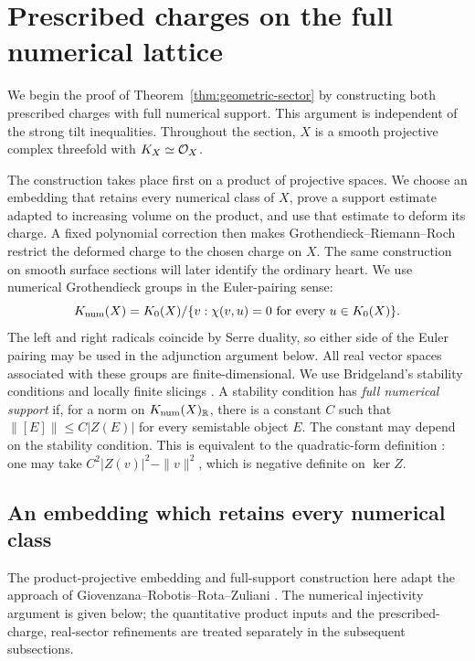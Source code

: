 \section{Prescribed charges on the full numerical lattice}
\label{sec:ambient}

We begin the proof of Theorem~\ref{thm:geometric-sector} by constructing
both prescribed charges with full numerical support.  This argument is
independent of the strong tilt inequalities.  Throughout the section,
$X$ is a smooth projective complex threefold with $K_X\simeq\mathcal O_X$.

The construction takes place first on a product of projective spaces.
We choose an embedding that retains every numerical class of $X$, prove
a support estimate adapted to increasing volume on the product, and use
that estimate to deform its charge.  A fixed polynomial correction then
makes Grothendieck--Riemann--Roch restrict the deformed charge to the
chosen charge on $X$.  The same construction on smooth surface sections
will later identify the ordinary heart.
We use numerical Grothendieck groups in the Euler-pairing sense:
\[
 K_{\mathrm{num}}(X)=K_0(X)/\{v:\chi(v,u)=0\text{ for every }u\in K_0(X)\}.
\]
The left and right radicals coincide by Serre duality, so either side of
the Euler pairing may be used in the adjunction argument below.
All real vector spaces associated with these groups are finite-dimensional.
We use Bridgeland's stability conditions and locally finite slicings
\cite{Bridgeland2007}.  A stability condition has \emph{full numerical support} if, for a norm on
$K_{\mathrm{num}}(X)_\mathbb R$, there is a constant $C$ such that
$\|[E]\|\le C|Z(E)|$ for every semistable object $E$.
The constant may depend on the stability condition.  This is equivalent to
the quadratic-form definition
\cite[Definition~1.1]{BayerDeformation2019}: one may take
$C^2|Z(v)|^2-\|v\|^2$, which is negative definite on $\ker Z$.

\subsection{An embedding which retains every numerical class}

The product-projective embedding and full-support construction here adapt
the approach of Giovenzana--Robotis--Rota--Zuliani
\cite{GiovenzanaRobotisRotaZuliani2026}.  The numerical injectivity argument
is given below; the quantitative product inputs and the prescribed-charge,
real-sector refinements are treated separately in the subsequent subsections.

